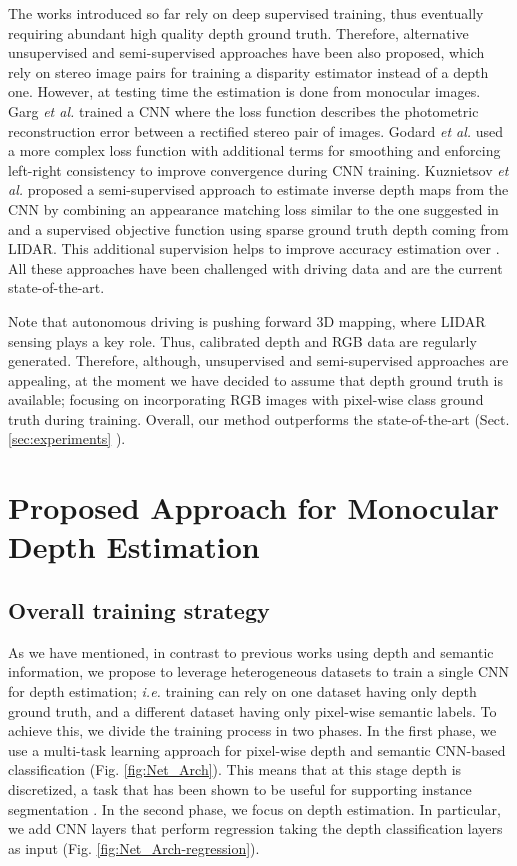 \documentclass[letterpaper, 10 pt, conference]{ieeeconf}
\newcommand{\ie}{{\em i.e.}}
\newcommand{\etal}{{\em et al.}}
\newcommand{\Fig}[1]{Fig. \ref{fig:#1}}
\newcommand{\Sect}[1]{Sect. \ref{sec:#1}}
\begin{document}
The works introduced so far rely on deep supervised training, thus eventually requiring abundant high quality depth ground truth. Therefore, alternative unsupervised and semi-supervised approaches have been also proposed, which rely on stereo image pairs for training a disparity estimator instead of a depth one. However, at testing time the estimation is done from monocular images. Garg {\etal} \cite{Garg:2016} trained a CNN where the loss function describes the photometric reconstruction error between a rectified stereo pair of images. Godard {\etal} \cite{Godard:2017} used a more complex loss function with additional terms for smoothing and enforcing left-right consistency to improve convergence during CNN training. Kuznietsov {\etal} \cite{Kuznietsov:2017} proposed a semi-supervised approach to estimate inverse depth maps from the CNN by combining an appearance matching loss similar to the one suggested in \cite{Godard:2017} and a supervised objective function using sparse ground truth depth coming from LIDAR. This additional supervision helps to improve accuracy estimation over \cite{Godard:2017}. All these approaches have been challenged with driving data and are the current state-of-the-art.

Note that autonomous driving is pushing forward 3D mapping, where  LIDAR sensing plays a key role. Thus, calibrated depth and RGB data are regularly generated. Therefore, although, unsupervised and semi-supervised approaches are appealing, at the moment we have decided to assume that depth ground truth is available; focusing on incorporating RGB images with pixel-wise class ground truth during training. Overall, our method outperforms the state-of-the-art (\Sect{experiments} ). 






 
\section{Proposed Approach for Monocular Depth Estimation}
\label{sec:method}

\subsection{Overall training strategy}

As we have mentioned, in contrast to previous works using depth and semantic information, we propose to leverage heterogeneous datasets to train a single CNN for depth estimation; {\ie} training can rely on one dataset having only depth ground truth, and a different dataset having only pixel-wise semantic labels. To achieve this, we divide the training process in two phases. In the first phase, we use a multi-task learning approach for pixel-wise depth and semantic CNN-based classification (\Fig{Net_Arch}). This means that at this stage depth is discretized, a task that has been shown to be useful for supporting instance segmentation \cite{Uhrig:2016}. In the second phase, we focus on depth estimation. In particular, we add CNN layers that perform regression taking the depth classification layers as input (\Fig{Net_Arch-regression}). 
\end{document}
